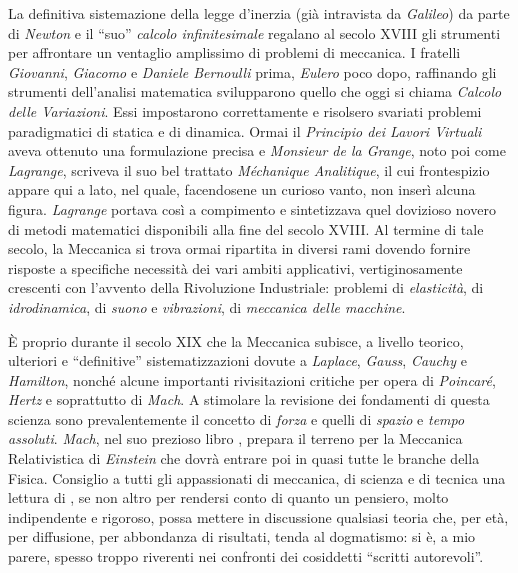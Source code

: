 \noindent La definitiva sistemazione della legge d'inerzia (gi\`a intravista da
{\em Galileo}) da parte di {\em Newton} e il ``suo''
{\em calcolo infinitesimale} 
regalano al secolo XVIII gli strumenti per affrontare un ventaglio amplissimo
di problemi di meccanica. I fratelli {\em Giovanni}, {\em Giacomo} e {\em Daniele Bernoulli}
prima, {\em Eulero}  poco dopo, raffinando gli strumenti dell'analisi matematica
svilupparono quello che oggi si chiama {\em Calcolo delle Variazioni}. Essi impostarono 
correttamente e risolsero svariati
problemi paradigmatici di statica e di dinamica. Ormai il {\em Principio dei Lavori
Virtuali} aveva ottenuto una formulazione precisa e {\em Monsieur de la Grange}, noto
poi come {\em Lagrange}, scriveva il suo bel trattato {\em M\'echanique Analitique},
il cui frontespizio appare qui a lato, nel
quale, facendosene un curioso vanto, non inser\`i alcuna figura.
{\em Lagrange} portava cos\`i a compimento e sintetizzava  quel dovizioso
novero di metodi matematici disponibili  
alla fine del secolo XVIII.
Al termine di tale secolo, la Meccanica si trova ormai ripartita
in diversi rami dovendo fornire risposte a specifiche
necessit\`a dei vari ambiti applicativi, vertiginosamente
crescenti con l'avvento della Rivoluzione Industriale:
problemi di
{\em elasticit\`a}, di {\em idrodinamica}, di {\em suono} e {\em vibrazioni}, di
{\em meccanica delle macchine}. 

\noindent \`E proprio durante il secolo XIX che la Meccanica subisce, a livello teorico, ulteriori
e ``definitive'' sistematizzazioni dovute a {\em Laplace}, {\em Gauss}, {\em Cauchy}
e {\em Hamilton}, nonch\'e alcune importanti rivisitazioni critiche per opera di {\em 
Poincar\'e}, {\em Hertz} e soprattutto di {\em Mach}. A stimolare la revisione dei
fondamenti
di questa scienza sono prevalentemente il concetto di {\em forza} e quelli di
{\em spazio} e
{\em tempo assoluti}. {\em Mach}, nel suo prezioso libro \cite{mach}, 
prepara il terreno per la Meccanica Relativistica di {\em Einstein} che dovr\`a 
entrare poi in quasi tutte le branche della Fisica. Consiglio a tutti gli
appassionati di meccanica, di scienza e di tecnica una lettura di \cite{mach}, se
non altro
per rendersi conto di quanto un pensiero, molto indipendente e rigoroso, possa mettere
in discussione qualsiasi teoria che, per et\`a, per diffusione, per abbondanza di
risultati, tenda al dogmatismo: si \`e, a mio parere,  spesso troppo riverenti
nei confronti dei cosiddetti ``scritti autorevoli''.

